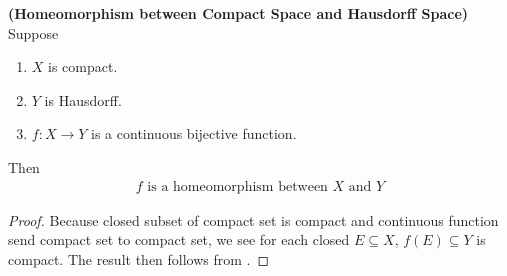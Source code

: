 \documentclass{report}
\begin{document}
\begin{theorem}
\label{HbC}
\textbf{(Homeomorphism between Compact Space and Hausdorff Space)} Suppose 
\begin{enumerate}[label=(\alph*)]
  \item $X$ is compact.  
  \item $Y$ is Hausdorff.  
  \item $f:X\rightarrow Y$ is a continuous bijective function. 
\end{enumerate}
Then 
\begin{align*}
f\text{ is a homeomorphism between }X\text{ and }Y
\end{align*}
\end{theorem}
\begin{proof}
Because closed subset of compact set is compact and continuous function send compact set to compact set, we see for each closed $E\subseteq X$, $f(E)\subseteq Y$ is compact. The result then follows from . 
\end{proof}
\end{document}
